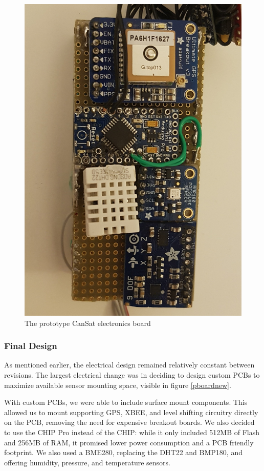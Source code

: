 \documentclass[]{report}
\begin{document}
\begin{figure}[h]
	\hfill\includegraphics[scale=0.1]{protoboard.jpg}\hspace*{\fill}
	\caption{The prototype CanSat electronics board}
	\label{pboard}
\end{figure}

\subsubsection{Final Design}
As mentioned earlier, the electrical design remained relatively constant between revisions. The largest electrical change was in deciding to design custom PCBs to maximize available sensor mounting space, visible in figure \ref{pboardnew}. 

With custom PCBs, we were able to include surface mount components. This allowed us to mount supporting GPS, XBEE, and level shifting circuitry directly on the PCB, removing the need for expensive breakout boards. We also decided to use the CHIP Pro instead of the CHIP: while it only included 512MB of Flash and 256MB of RAM, it promised lower power consumption and a PCB friendly footprint. We also used a BME280, replacing the DHT22 and BMP180, and offering humidity, pressure, and temperature sensors.
\end{document}
